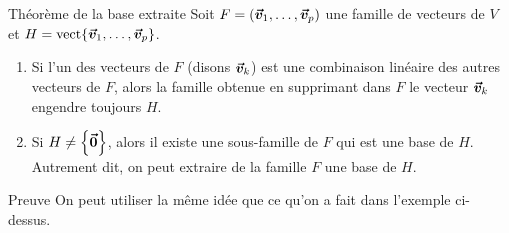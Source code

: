 \documentclass[a4paper]{article}
\begin{document}
\begin{parag}{Théorème de la base extraite}
    Soit $F = \left(\bvec{v}_1, \ldots, \bvec{v}_p\right)$ une famille de vecteurs de $V$ et $H = \vect\left\{\bvec{v}_1, \ldots, \bvec{v}_p\right\}$.
    \begin{enumerate}
        \item Si l'un des vecteurs de $F$ (disons $\bm{\protect\vec{v}}_k$) est une combinaison linéaire des autres vecteurs de $F$, alors la famille obtenue en supprimant dans $F$ le vecteur $\bm{\protect\vec{v}}_k$ engendre toujours $H$.
        \item Si $H \neq \left\{\bvec{0}\right\}$, alors il existe une sous-famille de $F$ qui est une base de $H$. Autrement dit, on peut extraire de la famille $F$ une base de $H$.
    \end{enumerate}

    \begin{subparag}{Preuve}
        On peut utiliser la même idée que ce qu'on a fait dans l'exemple ci-dessus.
    \end{subparag}

\end{parag}
\end{document}
